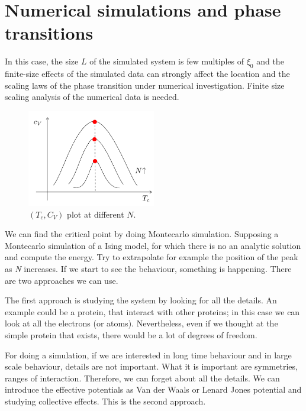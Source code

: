 \documentclass[../../Main/Main.tex]{subfiles}
\begin{document}
\clearpage

\section{Numerical simulations and phase transitions}

In this case, the size \( L \) of the simulated system is few multiples of \( \xi _0 \) and the finite-size effects of the simulated data can strongly affect the location and the scaling laws of the phase transition under numerical investigation.
Finite size scaling analysis of the numerical data is needed.

\begin{figure}[h!]
\centering
\includegraphics[width=0.5\textwidth]{./img/2.pdf}
\caption{\label{fig:5_2} \( (T_c,C_V) \) plot at different \( N \).}
\end{figure}


We can find the critical point by doing Montecarlo simulation. Supposing a Montecarlo simulation of a Ising model, for which there is no an analytic solution and compute the energy.
Try to extrapolate for example the position of the peak as \emph{N} increases. If we start to see the behaviour, something is happening.
There are two approaches we can use.

 The first approach is studying the system by looking for all the details. An example could be a protein, that interact with other proteins; in this case we can look at all the electrons (or atoms). Nevertheless, even if we thought at the simple protein that exists, there would be a lot of degrees of freedom.

  For doing a simulation, if we are interested in long time behaviour and in large scale behaviour, details are not important. What it is important are symmetries, ranges of interaction. Therefore, we can forget about all the details. We can introduce the effective potentials as Van der Waals or Lenard Jones potential and studying collective effects. This is the second approach.
\end{document}
